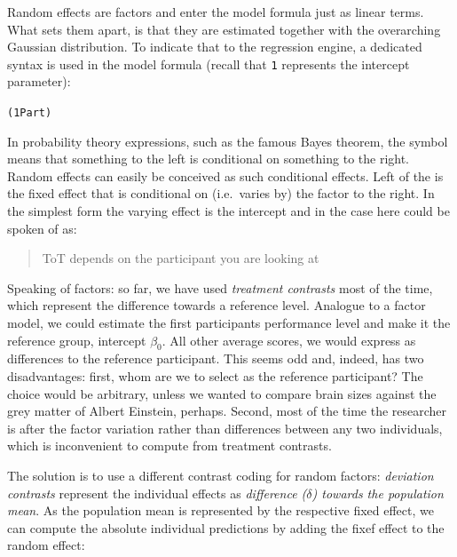 \documentclass[]{svmono}
\newenvironment{Shaded}{\begin{snugshade}}{\end{snugshade}}
\newcommand{\KeywordTok}[1]{\textcolor[rgb]{0.13,0.29,0.53}{\textbf{#1}}}
\newcommand{\DataTypeTok}[1]{\textcolor[rgb]{0.13,0.29,0.53}{#1}}
\newcommand{\StringTok}[1]{\textcolor[rgb]{0.31,0.60,0.02}{#1}}
\newcommand{\OperatorTok}[1]{\textcolor[rgb]{0.81,0.36,0.00}{\textbf{#1}}}
\newcommand{\NormalTok}[1]{#1}
\begin{document}
Random effects are factors and enter the model formula just as linear
terms. What sets them apart, is that they are estimated together with
the overarching Gaussian distribution. To indicate that to the
regression engine, a dedicated syntax is used in the model formula
(recall that \texttt{1} represents the intercept parameter):

\texttt{(1\textbar{}Part)}

In probability theory expressions, such as the famous Bayes theorem, the
\texttt{\textbar{}} symbol means that something to the left is
conditional on something to the right. Random effects can easily be
conceived as such conditional effects. Left of the \texttt{\textbar{}}
is the fixed effect that is conditional on (i.e.~varies by) the factor
to the right. In the simplest form the varying effect is the intercept
and in the case here could be spoken of as:

\begin{quote}
ToT depends on the participant you are looking at
\end{quote}

Speaking of factors: so far, we have used \emph{treatment contrasts}
most of the time, which represent the difference towards a reference
level. Analogue to a factor model, we could estimate the first
participants performance level and make it the reference group,
intercept \(\beta_0\). All other average scores, we would express as
differences to the reference participant. This seems odd and, indeed,
has two disadvantages: first, whom are we to select as the reference
participant? The choice would be arbitrary, unless we wanted to compare
brain sizes against the grey matter of Albert Einstein, perhaps. Second,
most of the time the researcher is after the factor variation rather
than differences between any two individuals, which is inconvenient to
compute from treatment contrasts.

The solution is to use a different contrast coding for random factors:
\emph{deviation contrasts} represent the individual effects as
\emph{difference (\(\delta\)) towards the population mean}. As the
population mean is represented by the respective fixed effect, we can
compute the absolute individual predictions by adding the fixef effect
to the random effect:

\begin{Shaded}
\end{Shaded}
\end{document}
